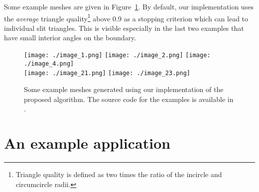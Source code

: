 \documentclass[12pt]{rmstyle}
\begin{document}
Some example meshes are given in Figure~\ref{fig:moreexamples}.  By
default, our implementation uses the \emph{average} triangle quality\footnote{Triangle
quality is defined as two times the ratio of the incircle and circumcircle
radii.} above 0.9 as a stopping criterion which can lead to individual slit triangles.
This is visible especially in the last two examples that have small
interior angles on the boundary.

\begin{figure}[htbp]
  \centering
  \texttt{[image: ./image\_1.png]}
  \texttt{[image: ./image\_2.png]}
  \texttt{[image: ./image\_4.png]}\\
  \texttt{[image: ./image\_21.png]}
  \texttt{[image: ./image\_23.png]}
  \caption{Some example meshes generated using our
    implementation of the proposed algorithm.
  The source code for the examples is available in \cite{tomgustafsson_2020}.}
\label{fig:moreexamples}
\end{figure}

\section{An example application}
\end{document}
